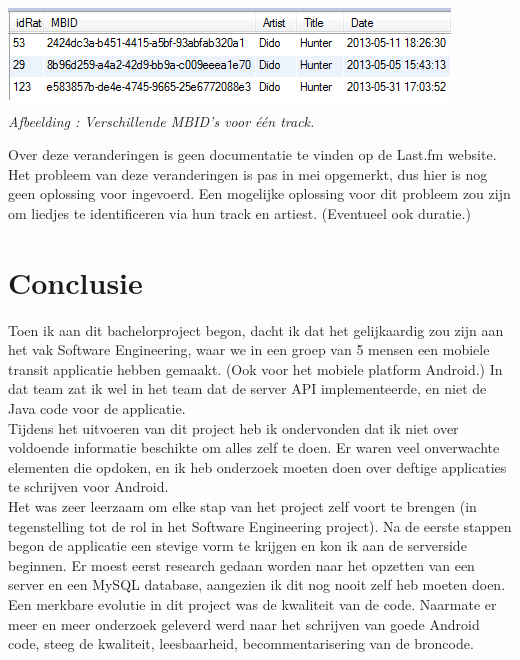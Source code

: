 \documentclass[11pt,a4paper]{article}
\newcounter{figc}
\newcommand{\increaseFigID} {%
   \stepcounter{figc}%
   \thefigc}
\newcommand{\figID}[1]{\small \textit{Afbeelding \increaseFigID : #1} \\ \normalsize}
\begin{document}
	\includegraphics[scale=1]{Pictures/mbid_change.png} \\
	\figID{Verschillende MBID's voor één track.}
	
	Over deze veranderingen is geen documentatie te vinden op de Last.fm website. Het probleem van deze veranderingen is pas in mei opgemerkt, dus hier is nog geen oplossing voor ingevoerd. Een mogelijke oplossing voor dit probleem zou zijn om liedjes te identificeren via hun track en artiest. (Eventueel ook duratie.) 


\newpage	
\section{Conclusie}
	\label{sec:Conclusie}
	
Toen ik aan dit bachelorproject begon, dacht ik dat het gelijkaardig zou zijn aan het vak Software Engineering, waar we in een groep van 5 mensen een mobiele transit applicatie hebben gemaakt. (Ook voor het mobiele platform Android.) In dat team zat ik wel in het team dat de server API implementeerde, en niet de Java code voor de applicatie. \\

Tijdens het uitvoeren van dit project heb ik ondervonden dat ik niet over voldoende informatie beschikte om alles zelf te doen. Er waren veel onverwachte elementen die opdoken, en ik heb onderzoek moeten doen over deftige applicaties te schrijven voor Android. \\

Het was zeer leerzaam om elke stap van het project zelf voort te brengen (in tegenstelling tot de rol in het Software Engineering project). Na de eerste stappen begon de applicatie een stevige vorm te krijgen en kon ik aan de serverside beginnen. Er moest eerst research gedaan worden naar het opzetten van een server en een MySQL database, aangezien ik dit nog nooit zelf heb moeten doen. \\

Een merkbare evolutie in dit project was de kwaliteit van de code. Naarmate er meer en meer onderzoek geleverd werd naar het schrijven van goede Android code, steeg de kwaliteit, leesbaarheid, becommentarisering van de broncode. \\
\end{document}
